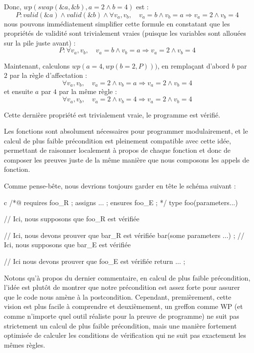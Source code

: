 Donc, $wp(swap(\&a, \&b), a = 2 \wedge b = 4)$ est :
$$P: valid(\&a) \wedge valid(\&b) \wedge \forall v_a, v_b, \quad v_a = b \wedge v_b = a \Rightarrow v_a = 2 \wedge v_b = 4$$
nous pouvons immédiatement simplifier cette formule en constatant que les propriétés
de validité sont trivialement vraies (puisque les variables sont allouées sur la pile
juste avant) :
$$P: \forall v_a, v_b, \quad v_a = b \wedge v_b = a \Rightarrow v_a = 2 \wedge v_b = 4$$


Maintenant, calculons $wp(a = 4, wp(b = 2, P)))$, en remplaçant d'abord $b$
par $2$ par la règle d'affectation :
$$\forall v_a, v_b, \quad v_a = 2 \wedge v_b = a \Rightarrow v_a = 2 \wedge v_b = 4$$
et ensuite $a$ par $4$ par la même règle :
$$\forall v_a, v_b, \quad v_a = 2 \wedge v_b = 4 \Rightarrow v_a = 2 \wedge v_b = 4$$


Cette dernière propriété est trivialement vraie, le programme est vérifié.




Les fonctions sont absolument nécessaires pour programmer modulairement, et le calcul
de plus faible précondition est pleinement compatible avec cette idée, permettant de
raisonner localement à propos de chaque fonction et donc de composer les preuves juste
de la même manière que nous composons les appels de fonction.


Comme pense-bête, nous devrions toujours garder en tête le schéma suivant :


\begin{CodeBlock}{c}
/*@
  requires foo_R ;
  assigns ... ;
  ensures foo_E ;
*/
type foo(parameters...){
  // Ici, nous supposons que foo_R est vérifiée


  // Ici, nous devons prouver que bar_R est vérifiée
  bar(some parameters ...) ;
  // Ici, nous supposons que bar_E est vérifiée


  // Ici nous devons prouver que foo_E est vérifiée
  return ... ;
}
\end{CodeBlock}


Notons qu'à propos du dernier commentaire, en calcul de plus faible précondition,
l'idée est plutôt de montrer que notre précondition est assez forte pour assurer
que le code nous amène à la postcondition. Cependant, premièrement, cette vision
est plus facile à comprendre et deuxièmement, un greffon comme WP (et comme n'importe
quel outil réaliste pour la preuve de programme) ne suit pas strictement un calcul
de plus faible précondition, mais une manière fortement optimisée de calculer les
conditions de vérification qui ne suit pas exactement les mêmes règles.


